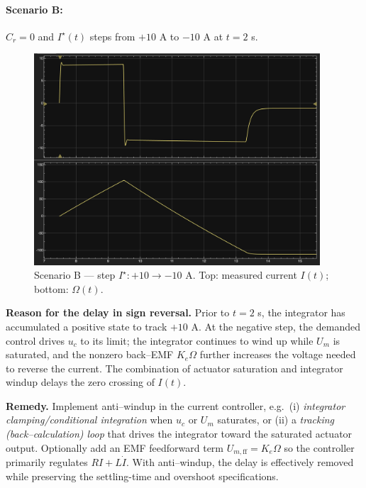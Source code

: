 \documentclass{rapportCS}
\begin{document}
\paragraph{Scenario B:} $C_r=0$ and $I^\star(t)$ steps from $+10$ A to $-10$ A at $t=2$ s.

\begin{figure}[H]
\centering
\includegraphics[width=0.95\textwidth]{figures/simulink2.png}
\caption{Scenario B — step $I^\star: +10 \rightarrow -10$ A. Top: measured current $I(t)$; bottom: $\Omega(t)$.}
\label{fig:part21_scnB}
\end{figure}

\textbf{Reason for the delay in sign reversal.} Prior to $t=2$ s, the integrator has accumulated a positive state to track $+10$ A. At the negative step, the demanded control drives $u_c$ to its limit; the integrator continues to wind up while $U_m$ is saturated, and the nonzero back–EMF $K_e\Omega$ further increases the voltage needed to reverse the current. The combination of actuator saturation and integrator windup delays the zero crossing of $I(t)$.

\textbf{Remedy.} Implement anti–windup in the current controller, e.g.\ (i) \emph{integrator clamping/conditional integration} when $u_c$ or $U_m$ saturates, or (ii) a \emph{tracking (back–calculation) loop} that drives the integrator toward the saturated actuator output. Optionally add an EMF feedforward term $U_{m,\mathrm{ff}}=K_e \Omega$ so the controller primarily regulates $R I + L \dot I$. With anti–windup, the delay is effectively removed while preserving the settling-time and overshoot specifications.

\end{document}

